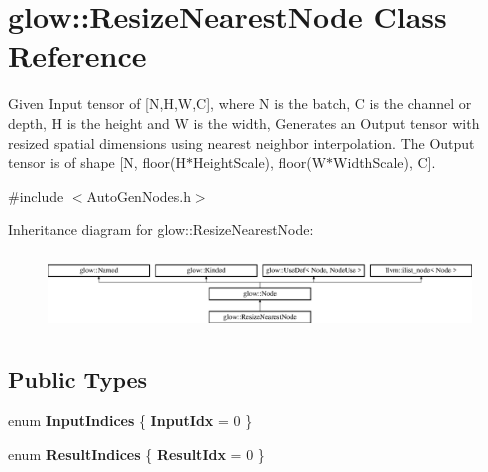 \hypertarget{classglow_1_1_resize_nearest_node}{}\section{glow\+:\+:Resize\+Nearest\+Node Class Reference}
\label{classglow_1_1_resize_nearest_node}


Given Input tensor of \mbox{[}N,H,W,C\mbox{]}, where N is the batch, C is the channel or depth, H is the height and W is the width, Generates an Output tensor with resized spatial dimensions using nearest neighbor interpolation. The Output tensor is of shape \mbox{[}N, floor(\+H$\ast$\+Height\+Scale), floor(\+W$\ast$\+Width\+Scale), C\mbox{]}.  




{\ttfamily \#include $<$Auto\+Gen\+Nodes.\+h$>$}

Inheritance diagram for glow\+:\+:Resize\+Nearest\+Node\+:\begin{figure}[H]
\begin{center}
\leavevmode
\includegraphics[height=2.028986cm]{classglow_1_1_resize_nearest_node}
\end{center}
\end{figure}
\subsection*{Public Types}
\begin{DoxyCompactItemize}
\item 
\mbox{\label{classglow_1_1_resize_nearest_node_a96967c627c96e4b2485b373afda328e8}} 
enum {\bfseries Input\+Indices} \{ {\bfseries Input\+Idx} = 0
 \}
\item 
\mbox{\label{classglow_1_1_resize_nearest_node_aa1979c2cf5452f73899f01a1dff3bde3}} 
enum {\bfseries Result\+Indices} \{ {\bfseries Result\+Idx} = 0
 \}
\end{DoxyCompactItemize}
